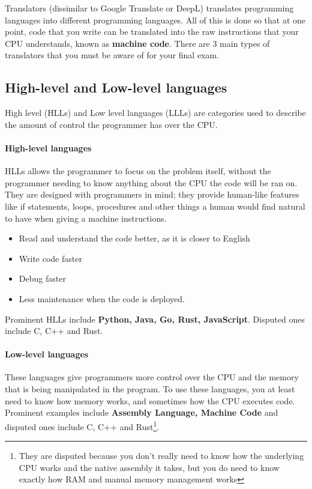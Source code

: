 \documentclass[../main.tex]{subfiles}
\begin{document}
Translators (dissimilar to Google Translate or DeepL) translates programming languages into different programming languages. All of this is done so that at one point, code that you write can be translated into the raw instructions that your CPU understands, known as \textbf{machine code}. There are 3 main types of translators that you must be aware of for your final exam.

\subsection{High-level and Low-level languages}

High level (HLLs) and Low level languages (LLLs) are categories used to describe the amount of control the programmer has over the CPU.

\paragraph{High-level languages}

HLLs allows the programmer to focus on the problem itself, without the programmer needing to know anything about the CPU the code will be ran on. They are designed with programmers in mind; they provide human-like features like if statements, loops, procedures and other things a human would find natural to have when giving a machine instructions. 

\begin{itemize}
    \item Read and understand the code better, as it is closer to English
    \item Write code faster
    \item Debug faster
    \item Less maintenance when the code is deployed.
\end{itemize}

Prominent HLLs include \textbf{Python, Java, Go, Rust, JavaScript}. Disputed ones include C, C++ and Rust.

\paragraph{Low-level languages}

These languages give programmers more control over the CPU and the memory that is being manipulated in the program. To use these languages, you at least need to know how memory works, and sometimes how the CPU executes code. Prominent examples include \textbf{Assembly Language, Machine Code} and disputed ones include C, C++ and Rust\footnote{They are disputed because you don't really need to know how the underlying CPU works and the native assembly it takes, but you do need to know exactly how RAM and manual memory management works}.
\end{document}
